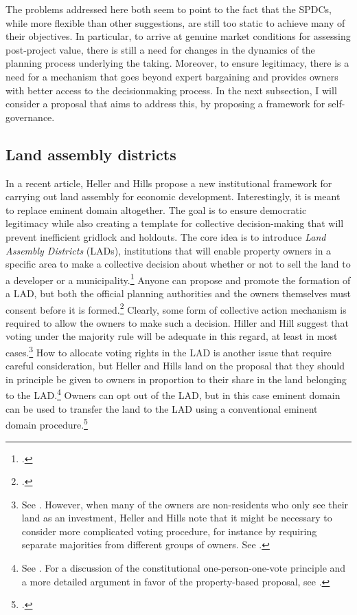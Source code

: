 \documentclass[12pt,a4paper]{book} %
\begin{document}
The problems addressed here both seem to point to the fact that the SPDCs, while more flexible than other suggestions, are still too static to achieve many of their objectives. In particular, to arrive at genuine market conditions for assessing post-project value, there is still a need for changes in the dynamics of the planning process underlying the taking. Moreover, to ensure legitimacy, there is a need for a mechanism that goes beyond expert bargaining and provides owners with better access to the decisionmaking process. In the next subsection, I will consider a proposal that aims to address this, by proposing a framework for self-governance. 

\subsection{Land assembly districts}

In a recent article, Heller and Hills propose a new institutional framework for carrying out land assembly for economic development. Interestingly, it is meant to replace eminent domain altogether. The goal is to ensure democratic legitimacy while also creating a template for collective decision-making that will prevent inefficient gridlock and holdouts. The core idea is to introduce {\it Land Assembly Districts} (LADs), institutions that will enable property owners in a specific area to make a collective decision about whether or not to sell the land to a developer or a municipality.\footcite[1469-1470]{heller08} Anyone can propose and promote the formation of a LAD, but both the official planning authorities and the owners themselves must consent before it is formed.\footcite[1488-1489]{heller08} Clearly, some form of collective action mechanism is required to allow the owners to make such a decision. Hiller and Hill suggest that voting under the majority rule will be adequate in this regard, at least in most cases.\footnote{See \cite[1496]{heller08}. However, when many of the owners are non-residents who only see their land as an investment, Heller and Hills note that it might be necessary to consider more complicated voting procedure, for instance by requiring separate majorities from different groups of owners. See \cite[1523-1524]{heller08}.} How to allocate voting rights in the LAD is another issue that require careful consideration, but Heller and Hills land on the proposal that they should in principle be given to owners in proportion to their share in the land belonging to the LAD.\footnote{See \cite[1492]{heller08}. For a discussion of the constitutional one-person-one-vote principle and a more detailed argument in favor of the property-based proposal, see \cite[1503-1507]{heller08}.} Owners can opt out of the LAD, but in this case eminent domain can be used to transfer the land to the LAD using a conventional eminent domain procedure.\footcite[1496]{heller08}
\end{document}
